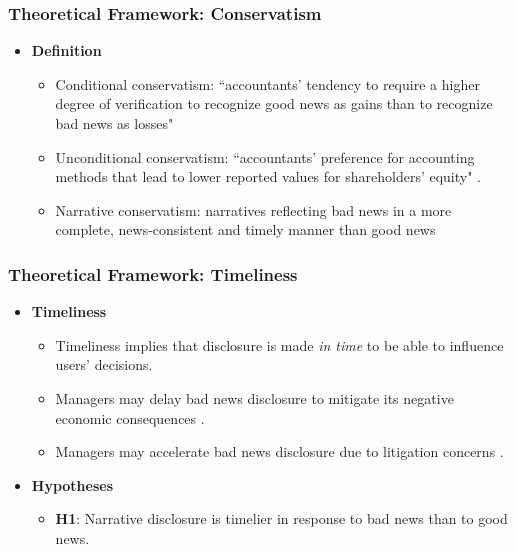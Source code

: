 \documentclass{beamer}
\begin{document}
\begin{frame}
\frametitle{Theoretical Framework: Conservatism}
\begin{itemize}
		
\item \textbf{Definition}

	\begin{itemize}
		\item Conditional conservatism: ``accountants' tendency to require a higher degree of verification to recognize good news as gains than to recognize bad news as losses" \citep*[p. 7]{basuConservatismPrincipleAsymmetric1997}
		\item Unconditional conservatism: ``accountants' preference for accounting methods that lead to lower reported values for shareholders' equity" \citep*[p. 8]{basuConservatismPrincipleAsymmetric1997}.
		\item Narrative conservatism: narratives reflecting bad news in a more complete, news-consistent and timely manner than good news
	\end{itemize}

\end{itemize}
\end{frame}
\begin{frame}
	\frametitle{Theoretical Framework: Timeliness}
	\begin{itemize}
		\item \textbf{Timeliness}
		
		\begin{itemize}
			\item Timeliness implies that disclosure is made \textit{in time} to be able to influence users' decisions. 
			\item Managers may delay bad news disclosure to mitigate its negative economic consequences \citep{chambersTimelinessReportingStock1984, niessnerStrategicDisclosureTiming2015, segalAreManagersStrategic2016, brockbankStrategicTiming8K2018}.
			\item Managers may accelerate bad news disclosure due to litigation concerns \citep{skinnerWhyFirmsVoluntarily1994, marinovicNoNewsGood2016}.
		\end{itemize}
		
		\item \textbf{Hypotheses}
		
		\begin{itemize}
			\item  \textbf{H1}: Narrative disclosure is timelier in response to bad news than to good news.
		\end{itemize}
		
	\end{itemize}
\end{frame}
\end{document}
